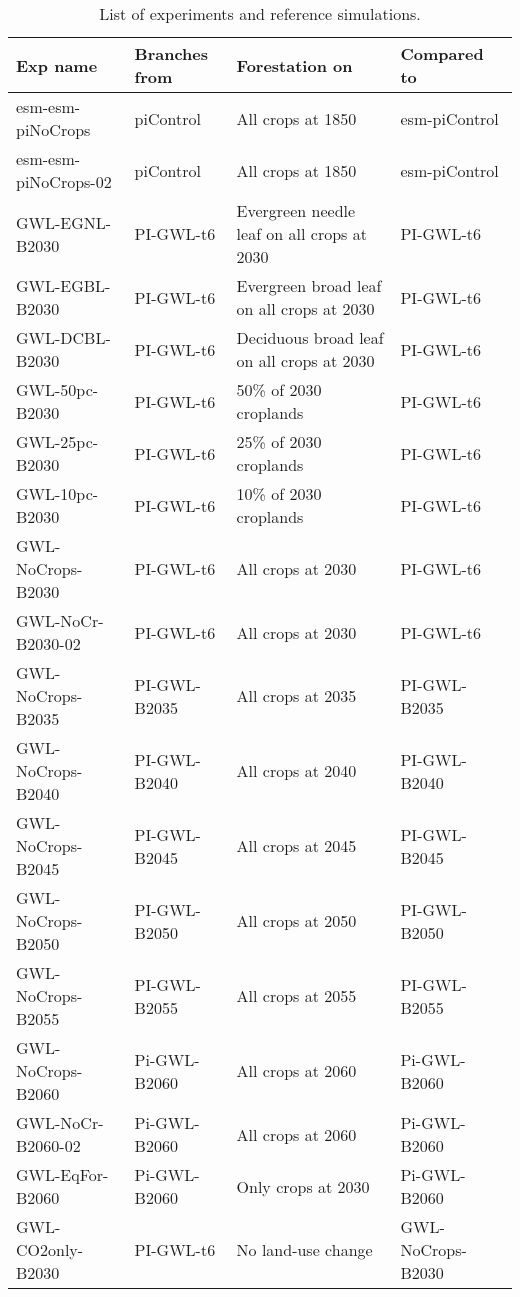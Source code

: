 \documentclass[]{article}
\begin{document}
\begin{table}[]
    \caption{List of experiments and reference simulations.}
    \label{tab:experiments}
    \begin{tabular}{llll}
\hline
Exp name             & Branches from & Forestation on               & Compared to       \\ \hline
esm-esm-piNoCrops    & piControl     & All crops at 1850            & esm-piControl     \\
esm-esm-piNoCrops-02 & piControl     & All crops at 1850            & esm-piControl     \\
GWL-EGNL-B2030       & PI-GWL-t6     & Evergreen needle leaf on all crops at 2030            & PI-GWL-t6         \\
GWL-EGBL-B2030       & PI-GWL-t6     & Evergreen broad leaf on all crops at 2030            & PI-GWL-t6         \\
GWL-DCBL-B2030       & PI-GWL-t6     & Deciduous broad leaf on all crops at 2030            & PI-GWL-t6         \\
GWL-50pc-B2030       & PI-GWL-t6     & 50\% of 2030 croplands       & PI-GWL-t6         \\
GWL-25pc-B2030       & PI-GWL-t6     & 25\% of 2030 croplands       & PI-GWL-t6         \\
GWL-10pc-B2030       & PI-GWL-t6     & 10\% of 2030 croplands       & PI-GWL-t6         \\
GWL-NoCrops-B2030    & PI-GWL-t6     & All crops at 2030            & PI-GWL-t6         \\
GWL-NoCr-B2030-02    & PI-GWL-t6     & All crops at 2030            & PI-GWL-t6         \\
GWL-NoCrops-B2035    & PI-GWL-B2035  & All crops at 2035            & PI-GWL-B2035      \\
GWL-NoCrops-B2040    & PI-GWL-B2040  & All crops at 2040            & PI-GWL-B2040      \\
GWL-NoCrops-B2045    & PI-GWL-B2045  & All crops at 2045            & PI-GWL-B2045      \\
GWL-NoCrops-B2050    & PI-GWL-B2050  & All crops at 2050            & PI-GWL-B2050      \\
GWL-NoCrops-B2055    & PI-GWL-B2055  & All crops at 2055            & PI-GWL-B2055      \\
GWL-NoCrops-B2060    & Pi-GWL-B2060  & All crops at 2060            & Pi-GWL-B2060      \\
GWL-NoCr-B2060-02    & Pi-GWL-B2060  & All crops at 2060            & Pi-GWL-B2060      \\
GWL-EqFor-B2060      & Pi-GWL-B2060  & Only crops at 2030           & Pi-GWL-B2060      \\
GWL-CO2only-B2030    & PI-GWL-t6     & No land-use change           & GWL-NoCrops-B2030 \\ \hline
\end{tabular}
\end{table}
\end{document}
